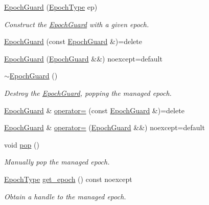 \begin{DoxyCompactItemize}
\item 
\hyperlink{structvt_1_1_epoch_guard_a89230b0cb27404fe74fd19ba667c54dc}{Epoch\+Guard} (\hyperlink{namespacevt_a985a5adf291c34a3ca263b3378388236}{Epoch\+Type} ep)
\begin{DoxyCompactList}\small\item\em Construct the \hyperlink{structvt_1_1_epoch_guard}{Epoch\+Guard} with a given epoch. \end{DoxyCompactList}\item 
\hyperlink{structvt_1_1_epoch_guard_a04f94ad13c6c3e709427adea95293ab6}{Epoch\+Guard} (const \hyperlink{structvt_1_1_epoch_guard}{Epoch\+Guard} \&)=delete
\item 
\hyperlink{structvt_1_1_epoch_guard_a0a59db6f3b1d71c397f64a37ed43fd40}{Epoch\+Guard} (\hyperlink{structvt_1_1_epoch_guard}{Epoch\+Guard} \&\&) noexcept=default
\item 
\hyperlink{structvt_1_1_epoch_guard_adf6677491e5d70a81645216b3cb65d0a}{$\sim$\+Epoch\+Guard} ()
\begin{DoxyCompactList}\small\item\em Destroy the \hyperlink{structvt_1_1_epoch_guard}{Epoch\+Guard}, popping the managed epoch. \end{DoxyCompactList}\item 
\hyperlink{structvt_1_1_epoch_guard}{Epoch\+Guard} \& \hyperlink{structvt_1_1_epoch_guard_adc52bcc301ca61c7cf3d52c725345ee6}{operator=} (const \hyperlink{structvt_1_1_epoch_guard}{Epoch\+Guard} \&)=delete
\item 
\hyperlink{structvt_1_1_epoch_guard}{Epoch\+Guard} \& \hyperlink{structvt_1_1_epoch_guard_aac8048b562920e1628ee5020d0e29da4}{operator=} (\hyperlink{structvt_1_1_epoch_guard}{Epoch\+Guard} \&\&) noexcept=default
\item 
void \hyperlink{structvt_1_1_epoch_guard_aa0106927b2e50b4be20bee542d264dba}{pop} ()
\begin{DoxyCompactList}\small\item\em Manually pop the managed epoch. \end{DoxyCompactList}\item 
\hyperlink{namespacevt_a985a5adf291c34a3ca263b3378388236}{Epoch\+Type} \hyperlink{structvt_1_1_epoch_guard_a41d2d7190be38fe256d6d8476a1f460e}{get\+\_\+epoch} () const noexcept
\begin{DoxyCompactList}\small\item\em Obtain a handle to the managed epoch. \end{DoxyCompactList}\end{DoxyCompactItemize}
